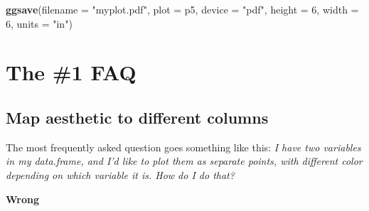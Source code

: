 \documentclass[]{book}
\newenvironment{Shaded}{\begin{snugshade}}{\end{snugshade}}
\newcommand{\KeywordTok}[1]{\textcolor[rgb]{0.13,0.29,0.53}{\textbf{#1}}}
\newcommand{\DataTypeTok}[1]{\textcolor[rgb]{0.13,0.29,0.53}{#1}}
\newcommand{\DecValTok}[1]{\textcolor[rgb]{0.00,0.00,0.81}{#1}}
\newcommand{\StringTok}[1]{\textcolor[rgb]{0.31,0.60,0.02}{#1}}
\newcommand{\OperatorTok}[1]{\textcolor[rgb]{0.81,0.36,0.00}{\textbf{#1}}}
\newcommand{\NormalTok}[1]{#1}
\begin{document}
\begin{Shaded}
\begin{Highlighting}[]
\KeywordTok{ggsave}\NormalTok{(}\DataTypeTok{filename =} \StringTok{"myplot.pdf"}\NormalTok{, }\DataTypeTok{plot =}\NormalTok{ p5, }\DataTypeTok{device =} \StringTok{"pdf"}\NormalTok{, }\DataTypeTok{height =} \DecValTok{6}\NormalTok{, }\DataTypeTok{width =} \DecValTok{6}\NormalTok{, }\DataTypeTok{units =} \StringTok{"in"}\NormalTok{)}
\end{Highlighting}
\end{Shaded}

\section{The \#1 FAQ}\label{the-1-faq}

\subsection{Map aesthetic to different
columns}\label{map-aesthetic-to-different-columns}

The most frequently asked question goes something like this: \emph{I
have two variables in my data.frame, and I'd like to plot them as
separate points, with different color depending on which variable it is.
How do I do that?}

\textbf{Wrong}

\begin{Shaded}
\end{Shaded}
\end{document}
